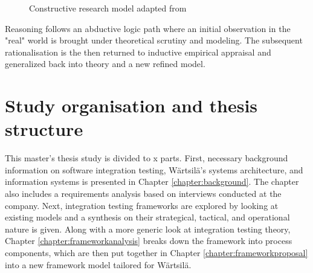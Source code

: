 \documentclass[12pt,a4paper,oneside,pdftex]{report}
\begin{document}
\begin{figure}[H]
\centering
\caption{Constructive research model adapted from \citet{kasanen1993constructive}} \label{fig:constructive}
\end{figure}

Reasoning follows an abductive logic path where an initial observation in the "real" world is brought under theoretical scrutiny and modeling. The subsequent rationalisation is the then returned to inductive empirical appraisal and generalized back into theory and a new refined model. \citep{josephson1996abductive}


\section{Study organisation and thesis structure}
\label{section:structure}
This master's thesis study is divided to x parts. First, necessary background information on software integration testing, Wärtsilä's systems architecture, and information systems is presented in Chapter \ref{chapter:background}. The chapter also includes a requirements analysis based on interviews conducted at the company. Next, integration testing frameworks are explored by looking at existing models and a synthesis on their strategical, tactical, and operational nature is given. Along with a more generic look at integration testing theory, Chapter \ref{chapter:frameworkanalysis} breaks down the framework into process components, which are then put together in Chapter \ref{chapter:frameworkproposal} into a new framework model tailored for Wärtsilä.
\end{document}
